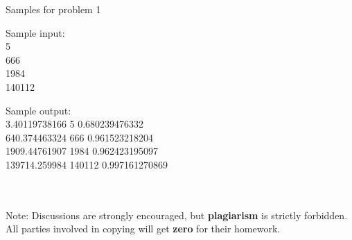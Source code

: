 \documentclass[12pt]{article}
\begin{document}
Samples for problem 1\\

\begin{minipage}{0.5\textwidth}
Sample input:\\
5\\
666\\
1984\\
140112\\
\end{minipage}
\begin{minipage}{0.5\textwidth}
Sample output:\\
3.40119738166 5 0.680239476332\\
640.374463324 666 0.961523218204\\
1909.44761907 1984 0.962423195097\\
139714.259984 140112 0.997161270869\\

\end{minipage}
\\
\\
Note: Discussions are strongly encouraged, but \textbf{plagiarism} is strictly forbidden. All parties involved in copying will get \textbf{zero} for their homework.
\end{document}
